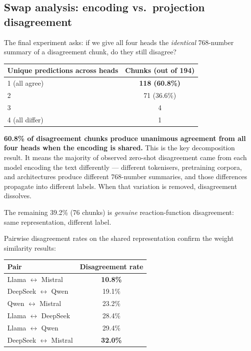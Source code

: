 \documentclass[11pt,a4paper]{article}
\begin{document}
\subsection{Swap analysis: encoding vs.\ projection disagreement}

The final experiment asks: if we give all four heads the \emph{identical}
768-number summary of a disagreement chunk, do they still disagree?

\begin{center}
\begin{tabular}{lc}
\toprule
\textbf{Unique predictions across heads} & \textbf{Chunks (out of 194)} \\
\midrule
1 (all agree)   & \textbf{118 (60.8\%)} \\
2               & 71 (36.6\%) \\
3               & 4 \\
4 (all differ)  & 1 \\
\bottomrule
\end{tabular}
\end{center}

\textbf{60.8\% of disagreement chunks produce unanimous agreement from all
four heads when the encoding is shared.} This is the key decomposition result.
It means the majority of observed zero-shot disagreement came from each model
encoding the text differently --- different tokenisers, pretraining corpora,
and architectures produce different 768-number summaries, and those differences
propagate into different labels. When that variation is removed, disagreement
dissolves.

The remaining 39.2\% (76 chunks) is \emph{genuine} reaction-function
disagreement: same representation, different label.

Pairwise disagreement rates on the shared representation confirm the weight
similarity results:

\begin{center}
\begin{tabular}{lc}
\toprule
\textbf{Pair} & \textbf{Disagreement rate} \\
\midrule
Llama $\leftrightarrow$ Mistral   & \textbf{10.8\%} \\
DeepSeek $\leftrightarrow$ Qwen   & 19.1\% \\
Qwen $\leftrightarrow$ Mistral    & 23.2\% \\
Llama $\leftrightarrow$ DeepSeek  & 28.4\% \\
Llama $\leftrightarrow$ Qwen      & 29.4\% \\
DeepSeek $\leftrightarrow$ Mistral & \textbf{32.0\%} \\
\bottomrule
\end{tabular}
\end{center}
\end{document}
